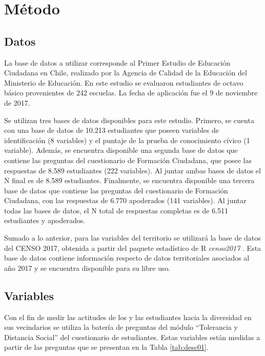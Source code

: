 \documentclass[12pt,twoside]{templates/facsothesis}
\begin{document}
\hypertarget{muxe9todo}{%
\chapter{Método}\label{muxe9todo}}

\hypertarget{datos}{%
\section{Datos}\label{datos}}

La base de datos a utilizar corresponde al Primer Estudio de Educación Ciudadana en Chile, realizado por la Agencia de Calidad de la Educación del Ministerio de Educación. En este estudio se evaluaron estudiantes de octavo básico provenientes de 242 escuelas. La fecha de aplicación fue el 9 de noviembre de 2017.

Se utilizan tres bases de datos disponibles para este estudio. Primero, se cuenta con una base de datos de 10.213 estudiantes que poseen variables de identificación (8 variables) y el puntaje de la prueba de conocimiento cívico (1 variable). Además, se encuentra disponible una segunda base de datos que contiene las preguntas del cuestionario de Formación Ciudadana, que posee las respuestas de 8.589 estudiantes (222 variables). Al juntar ambas bases de datos el N final es de 8.589 estudiantes. Finalmente, se encuentra disponible una tercera base de datos que contiene las preguntas del cuestionario de Formación Ciudadana, con las respuestas de 6.770 apoderados (141 variables). Al juntar todas las bases de datos, el N total de respuestas completas es de 6.511 estudiantes y apoderados.

Sumado a lo anterior, para las variables del territorio se utilizará la base de datos del CENSO 2017, obtenida a partir del paquete estadístico de R \emph{censo2017} \citep{vargas_censo2017_2022}. Esta base de datos contiene información respecto de datos territoriales asociados al año 2017 y se encuentra disponible para su libre uso.

\hypertarget{variables}{%
\section{Variables}\label{variables}}

Con el fin de medir las actitudes de los y las estudiantes hacia la diversidad en sus vecindarios se utiliza la batería de preguntas del módulo ``Tolerancia y Distancia Social'' del cuestionario de estudiantes. Estas variables están medidas a partir de las preguntas que se presentan en la Tabla \ref{tab:desc01}.
\end{document}
